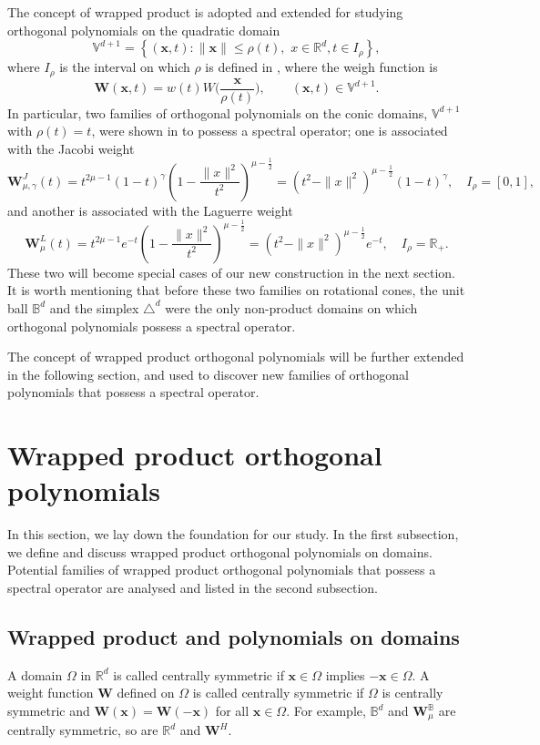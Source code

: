 \documentclass{amsart}
\theoremstyle{remark}
\def\g{{\gamma}}
\def\xb{{\bm x}}
\def\Wb{{\bm W}}
\def\BB{{\mathbb B}}
\def\RR{{\mathbb R}}
\def\VV{{\mathbb V}}
\def\f{\frac}
\begin{document}
The concept of wrapped product is adopted and extended for studying orthogonal polynomials
on the quadratic domain 
$$
  \VV^{d+1} = \left\{(\xb, t): \|\xb\| \le \rho(t), \,\, x \in \RR^d, t \in I_\rho\right\},
$$
where $I_\rho$ is the interval on which $\rho$ is defined in \cite{OX, X20}, where the weigh function
is 
\begin{equation}\label{eq:wrap_d1}
    \Wb(\xb,t) =  w (t) W\bigg(\frac{\xb}{\rho(t)}\bigg), \qquad (\xb,t) \in \VV^{d+1}. 
\end{equation}
In particular, two families of orthogonal polynomials on the conic domains, $\VV^{d+1}$ with $\rho(t) = t$, 
were shown in \cite{X20} to possess a spectral operator; one is associated with the Jacobi weight 
$$
  \Wb_{\mu,\g}^J(t) = t^{2\mu-1} (1-t)^\g \left(1- \frac{\|x\|^2}{t^2}\right)^{\mu-\f12}= (t^2-\|x\|^2)^{\mu-\f12} (1-t)^\g,
   \quad I_\rho = [0,1], 
$$
and another is associated with the Laguerre weight 
$$
    \Wb_{\mu}^L(t) = t^{2\mu-1} e^{-t} \left(1- \frac{\|x\|^2}{t^2}\right)^{\mu-\f12}=
        (t^2-\|x\|^2)^{\mu-\f12} e^{-t}, \quad I_\rho = \RR_+. 
$$
These two will become special cases of our new construction in the next section. It is worth mentioning that 
before these two families on rotational cones, the unit ball $\BB^d$ and the simplex $\triangle^d$ 
were the only non-product domains on which orthogonal polynomials possess a spectral operator.
\medskip

The concept of wrapped product orthogonal polynomials will be further extended in the following section,
and used to discover new families of orthogonal polynomials that possess a spectral operator.

\section{Wrapped product orthogonal polynomials}
\setcounter{equation}{0}

In this section, we lay down the foundation for our study. In the first subsection, we define and discuss 
wrapped product orthogonal polynomials on domains. Potential families of wrapped product orthogonal 
polynomials that possess a spectral operator are analysed and listed in the second subsection. 

\subsection{Wrapped product and polynomials on domains} 
A domain $\Omega$ in $\RR^d$ is called centrally symmetric if $\xb \in \Omega$ implies $- \xb \in \Omega$. 
A weight function $\Wb$ defined on $\Omega$ is called centrally symmetric if $\Omega$ is centrally
symmetric and $\Wb(\xb) = \Wb(-\xb)$ for all $\xb \in \Omega$. For example, $\BB^d$ and $\Wb_\mu^\BB$
are centrally symmetric, so are $\RR^d$ and $\Wb^H$. 
\end{document}
